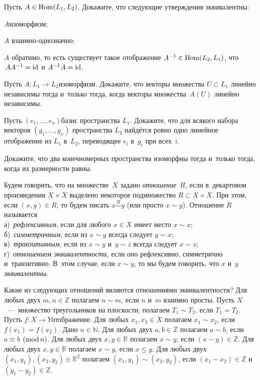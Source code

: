 \documentclass[a4paper,12pt,fleqn]{article}
\begin{document}
Пусть $A\in\operatorname{Hom}(L_1,L_2)$.
Докажите, что  следующие утверждения эквивалентны:
\begin{items}{-3}
\item[1)]
$A$\т  изоморфизм;
\item[2)]
$A$ взаимно-однозначно;
\item[3)]
$A$ обратимо, то есть существует такое отображение $A^{-1}\in \operatorname{Hom}(L_2,L_1)$, что
$\,AA^{-1}=\operatorname{id}$ и $A^{-1}A=\operatorname{id}$.
\end{items}

\vspace{-3mm}
Пусть $A\colon L_1\to L_2$\т изоморфизм. Докажите, что векторы множества $U\subset L_1$ линейно независимы тогда и~только тогда, когда векторы множества~$A(U)$ линейно независимы.

Пусть $(e_1,\dots,e_n)$\т базис пространства $L_1$. Докажите, что для всякого набора векторов $(g_1,\dots,g_n)$ пространства $L_2$ найдётся ровно одно линейное отображение из $L_1$ в~$L_2$, переводящее $e_i$ в~$g_i$ при всех~$i$.

Докажите, что два конечномерных пространства изоморфны тогда и~только тогда, когда их размерности равны.

\newpage


Будем говорить, что на множестве~$X$ задано {\it отношение}~$R$, если в~декартовом произведении $X\times X$ выделено некоторое подмножество $R\subset X\times X$. При этом, если $(x,y)\in  R$, то будем писать $x\stackrel{R}{\sim} y$ (или просто $x\sim y$).
Отношение $R$ называется\\
а)~{\it рефлексивным}, если для любого $x\in  X$ имеет место $x\sim x$;\\
б)~{\it симметричным}, если из $x\sim y$ всегда следует $y\sim x$;\\
в)~{\it транзитивным}, если из $x\sim y$ и~$y\sim z$ всегда следует $x\sim z$;\\
г)~{\it отношением эквивалентности}, если оно рефлексивно, симметрично и~транзитивно. В~этом случае, если $x\sim y$, то мы будем говорить, что $x$ и~$y$ {\it эквивалентны}.

Какие из следующих отношений являются отношениями эквивалентности?
 Для любых двух $m,n\in\mathbb Z$ полагаем $n\sim m$, если $n$ и~$m$ взаимно просты.
 Пусть $X$~---~множество треугольников на плоскости; полагаем $T_{1}\sim T_{2}$, если $T_{1}=T_{2}$.
 Пусть $f:X\to Y$\т отображение. Для любых $x_{1},x_{2}\in X$ полагаем $x_{1}\sim x_{2}$, если $f(x_{1})=f(x_{2})$.
 Дано $n\in\mathbb N$. Для любых двух $a,b\in\mathbb Z$ полагаем $a\sim b$, если $a\equiv b$ $({\rm mod}\,n)$.
 Для любых двух $x,y\in\mathbb R$ полагаем $x\sim y$, если $(x-y)\in\mathbb Z$.
 Для любых двух $x,y\in\mathbb R$ полагаем $x\sim y$, если $x\leqslant y$.
 Для любых двух $(x_{1},y_{1}),(x_{2},y_{2})\in\mathbb R^{2}$ полагаем $(x_{1},y_{1})\sim(x_{2},y_{2})$, если $(x_{1}-x_{2})\in\mathbb Z$ и~$(y_{1}-y_{2})\in\mathbb Z$.
\end{document}
